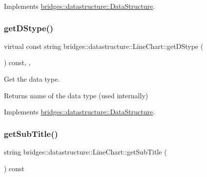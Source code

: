 Implements \hyperlink{classbridges_1_1datastructure_1_1_data_structure}{bridges\+::datastructure\+::\+Data\+Structure}.

\mbox{\label{classbridges_1_1datastructure_1_1_line_chart_a431e49c31cdd5f46e978742776306dfa}} 
\subsubsection{\texorpdfstring{get\+D\+Stype()}{getDStype()}}
{\footnotesize\ttfamily virtual const string bridges\+::datastructure\+::\+Line\+Chart\+::get\+D\+Stype (\begin{DoxyParamCaption}{ }\end{DoxyParamCaption}) const\hspace{0.3cm}{\ttfamily [inline]}, {\ttfamily [override]}, {\ttfamily [virtual]}}



Get the data type. 

\begin{DoxyReturn}{Returns}
name of the data type (used internally) 
\end{DoxyReturn}


Implements \hyperlink{classbridges_1_1datastructure_1_1_data_structure_a4ff66cb34409f11fe9fc647f6d8a22ce}{bridges\+::datastructure\+::\+Data\+Structure}.

\mbox{\label{classbridges_1_1datastructure_1_1_line_chart_a07a4424d4bbc1cdd15cef3e2c0f0c075}} 
\subsubsection{\texorpdfstring{get\+Sub\+Title()}{getSubTitle()}}
{\footnotesize\ttfamily string bridges\+::datastructure\+::\+Line\+Chart\+::get\+Sub\+Title (\begin{DoxyParamCaption}{ }\end{DoxyParamCaption}) const\hspace{0.3cm}{\ttfamily [inline]}}



